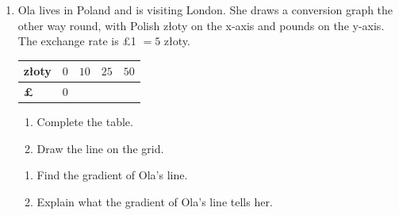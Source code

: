 \documentclass[12pt,a4paper]{article}
\newcommand{\ansline}[1][2.2cm]{\underline{\hspace{#1}}}
\newcommand{\zl}{z\l{}oty}
\begin{document}
\begin{enumerate}[resume]
\begin{enumerate}
        \vspace{4.5em}
\end{enumerate}

\newpage

\item Ola lives in Poland and is visiting London. She draws a conversion graph
the other way round, with Polish \zl{} on the x-axis and pounds on the
y-axis. The exchange rate is \pounds1 $=5$ \zl{}.
\vspace{2pt}

\begin{minipage}[t]{0.62\linewidth}
\centering
{}
\end{minipage}%
\begin{minipage}[t]{0.38\linewidth}
\vspace{6pt}
\begin{tabular}{|l|c|c|c|c|}
\hline
\textbf{\zl{}} & $0$ & $10$ & $25$ & $50$\\
\hline
\textbf{\pounds} & $0$ & & & \\
\hline
\end{tabular}

\begin{enumerate}
  \item Complete the table.
  \item Draw the line on the grid.
\end{enumerate}
\end{minipage}

\begin{enumerate}[start=3]
  \item Find the gradient of Ola's line. \hfill \ansline[3cm]

        \vspace{4em}
  \item Explain what the gradient of Ola's line tells her.

        \vspace{6em}
\end{enumerate}

\end{enumerate}
\end{document}
